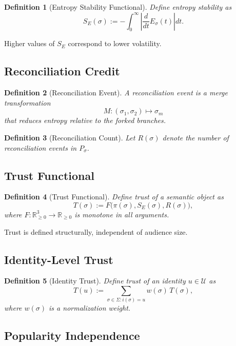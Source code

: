 \documentclass[11pt]{article}
\newtheorem{definition}{Definition}
\begin{document}
\begin{definition}[Entropy Stability Functional]
Define entropy stability as
\[
S_E(\sigma) := -\int_{0}^{\infty} \left| \frac{d}{dt} E_\sigma(t) \right| dt.
\]
\end{definition}

Higher values of $S_E$ correspond to lower volatility.

\subsection{Reconciliation Credit}

\begin{definition}[Reconciliation Event]
A reconciliation event is a merge transformation
\[
M : (\sigma_1, \sigma_2) \mapsto \sigma_m
\]
that reduces entropy relative to the forked branches.
\end{definition}

\begin{definition}[Reconciliation Count]
Let $R(\sigma)$ denote the number of reconciliation events in $P_\sigma$.
\end{definition}

\subsection{Trust Functional}

\begin{definition}[Trust Functional]
Define trust of a semantic object as
\[
T(\sigma) := F\bigl(\pi(\sigma), S_E(\sigma), R(\sigma)\bigr),
\]
where $F : \mathbb{R}_{\ge 0}^3 \to \mathbb{R}_{\ge 0}$ is monotone in all arguments.
\end{definition}

Trust is defined structurally, independent of audience size.

\subsection{Identity-Level Trust}

\begin{definition}[Identity Trust]
Define trust of an identity $u \in \mathcal{U}$ as
\[
T(u) := \sum_{\sigma \in \Sigma : i(\sigma)=u} w(\sigma)\, T(\sigma),
\]
where $w(\sigma)$ is a normalization weight.
\end{definition}

\subsection{Popularity Independence}
\end{document}

